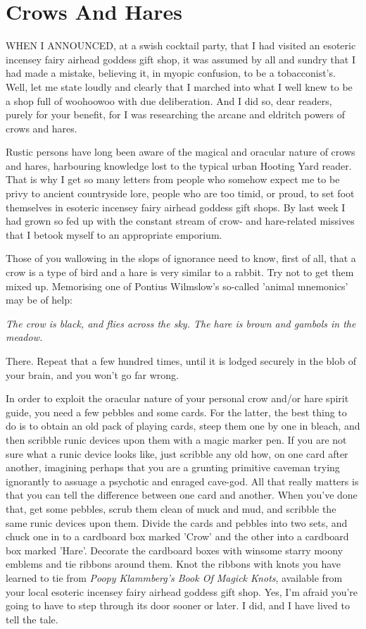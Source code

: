 \chapter{Crows And Hares}

WHEN I ANNOUNCED, at a swish cocktail party, that I had visited an esoteric incensey fairy airhead goddess gift shop, it was assumed by all and sundry that I had made a  mistake, believing it, in myopic confusion, to be a tobacconist's. Well, let me state loudly and clearly that I marched into what I well knew to be a shop full of woohoowoo with due deliberation. And I did so, dear readers, purely for your benefit, for I was researching the arcane and eldritch powers of crows and hares.

Rustic persons have long been aware of the magical and oracular nature of crows and hares, harbouring knowledge lost to the typical urban Hooting Yard reader. That is why I get so many letters from people who somehow expect me to be privy to ancient countryside lore, people who are too timid, or proud, to set foot themselves in esoteric incensey fairy airhead goddess gift shops. By last week I had grown so fed up with the constant stream of crow- and hare-related missives that I betook myself to an appropriate emporium.

Those of you wallowing in the slops of ignorance need to know, first of all, that a crow is a type of bird and a hare is very similar to a rabbit. Try not to get them mixed up. Memorising one of Pontius Wilmslow's so-called 'animal mnemonics' may be of help:

\emph{The crow is black, and flies across the sky. The hare is brown and gambols in the meadow.}

There. Repeat that a few hundred times, until it is lodged securely in the blob of your brain, and you won't go far wrong.

In order to exploit the oracular nature of your personal crow and/or hare spirit guide, you need a few pebbles and some cards. For the latter, the best thing to do is to obtain an old pack of playing cards, steep them one by one in bleach, and then scribble runic devices upon them with a magic marker pen. If you are not sure what a runic device looks like, just scribble any old how, on one card after another, imagining perhaps that you are a grunting primitive caveman trying ignorantly to assuage a psychotic and enraged cave-god. All that really matters is that you can tell the difference between one card and another. When you've done that, get some pebbles, scrub them clean of muck and mud, and scribble the same runic devices upon them. Divide the cards and pebbles into two sets, and chuck one in to a cardboard box marked 'Crow' and the other into a cardboard box marked 'Hare'. Decorate the cardboard boxes with winsome starry moony emblems and tie ribbons around them. Knot the ribbons with knots you have learned to tie from \emph{Poopy Klammberg's Book Of Magick Knots}, available from your local esoteric incensey fairy airhead goddess gift shop. Yes, I'm afraid you're going to have to step through its door sooner or later. I did, and I have lived to tell the tale.

